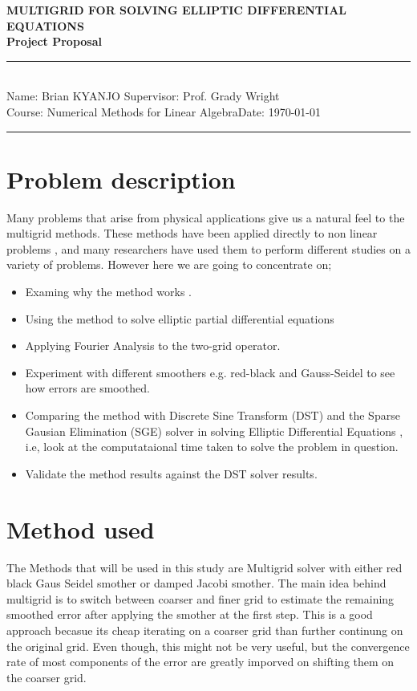 \documentclass[12pt,a4paper]{article}
\newcommand{\student}{Brian KYANJO }
\newcommand{\course}{Numerical Methods for Linear Algebra}
\newcommand{\assignment}{ Prof. Grady Wright}
\begin{document}
	
	\thispagestyle{empty}
	\begin{center}
		\textbf{MULTIGRID FOR SOLVING ELLIPTIC DIFFERENTIAL EQUATIONS \\[0.5cm]
		Project Proposal}
		\vspace{.2cm}
	\end{center}
	
	\noindent
	\rule{17cm}{0.2cm}\\[0.3cm]
	Name: \student \hfill Supervisor: \assignment\\[0.1cm]
	Course: \course \hfill Date: \today\\
	\rule{17cm}{0.05cm}
	\vspace{.2cm}
	
	\section*{Problem description}
	Many problems that arise from physical applications give us a natural feel to the multigrid methods. These methods have been applied directly to non linear problems 	\cite{briggs2000multigrid}, and many researchers have used them to perform different studies on a variety of problems. However here we are going to concentrate on;
	\begin{itemize}
		\item Examing why the method works	\cite{trottenberg2000multigrid}.
		\item  Using the method  to solve elliptic partial differential equations
		\item Applying Fourier Analysis to the two-grid operator.
		\item Experiment with different smoothers e.g. red-black and Gauss-Seidel to see how errors are smoothed.
		\item Comparing the method with Discrete Sine Transform  (DST)  and the Sparse Gausian Elimination (SGE) solver in solving Elliptic Differential Equations , i.e, look at the computataional time taken to solve the problem in question. 
		\item Validate the method results against  the DST solver results.
	\end{itemize}

	\section*{Method used}
	The Methods that will be used in this study are Multigrid solver with either red black Gaus Seidel smother or damped Jacobi smother. The main idea behind multigrid is to switch between coarser and finer grid to estimate the remaining smoothed error after applying the smother at the first step. This is a good approach becasue its cheap iterating on a coarser grid than further continung on the original grid. Even though, this might not be very useful, but the convergence rate of most components of the error are greatly imporved on shifting them on the coarser grid.\\
	
\end{document}
